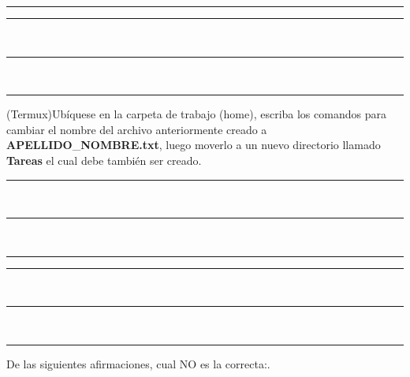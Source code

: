 \documentclass[12pt]{exam}
\begin{document}
\begin{questions}
\begin{minipage}[H]{0.40\linewidth}
  \noindent \rule{7cm}{0.4pt}
\end{minipage} \hspace{2cm} 
\begin{minipage}[H]{0.40\linewidth}
    \noindent \rule{7cm}{0.4pt} \\
  

  
    \noindent \rule{7cm}{0.4pt} \\
  
    \noindent \rule{7cm}{0.4pt}
\end{minipage}


\question[20] (Termux)Ubíquese en la carpeta de trabajo (home), escriba los
comandos  para  cambiar el nombre del archivo anteriormente creado  a \textbf{APELLIDO}\_\textbf{NOMBRE}\textbf{.txt}, luego moverlo a un
nuevo directorio llamado \textbf{Tareas} el cual debe también
ser creado.\\

\begin{minipage}[H]{0.40\linewidth}
  \noindent \rule{7cm}{0.4pt} \\
  

  
  \noindent \rule{7cm}{0.4pt} \\
  
  \noindent \rule{7cm}{0.4pt}
\end{minipage} \hspace{2cm} 
\begin{minipage}[H]{0.40\linewidth}
    \noindent \rule{7cm}{0.4pt} \\
  
  
    \noindent \rule{7cm}{0.4pt} \\
  
    \noindent \rule{7cm}{0.4pt}
\end{minipage}

\newpage


\question[20] De las siguientes afirmaciones, cual NO es la correcta:.

\end{questions}
\end{document}
